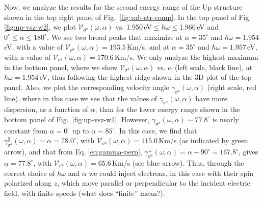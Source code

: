 \documentclass[floatfix,prb,aps,superscriptaddress,showpacs,11pt,preprint,letterpaper]{revtex4}
\begin{document}
Now, we analyze the results for the second energy range of the Up structure
shown in the top right panel of Fig.~\ref{fig:vab-str-comp}. In the top panel
of Fig. \ref{fig:up-vsz-w2}, we plot $\mathcal{V}_{\sigma^{\mathrm{z}}}
(\omega,\alpha)$ vs. 1.950\,eV$\leq\hbar\omega\leq$1.960\,eV and
$0^\circ\leq\alpha\leq 180^\circ$. We see two broad peaks that maximize at
$\alpha=35^{\circ}$ and $\hbar\omega= 1.954$\,eV, with a value of
$\mathcal{V}_{\sigma^{\mathrm{z}}}(\omega,\alpha) = 193.5$\,Km/s, and at
$\alpha=35^{\circ}$ and $\hbar\omega= 1.957$\,eV, with a value of
$\mathcal{V}_{\sigma^{\mathrm{z}}}(\omega,\alpha) = 170.6$\,Km/s. We only
analyze the highest  maximum in the bottom panel, where we  show
$\mathcal{V}_{\sigma^{\mathrm{z}}} (\omega,\alpha)$ vs. $\alpha$ (left scale,
black line), at $\hbar\omega= 1.954$\,eV, thus following the highest ridge
shown in the 3D plot of the top panel. Also, we plot the corresponding velocity
angle $\gamma_{\sigma^\mathrm{z}}(\omega,\alpha)$ (right scale, red line),
where in this case we see that the values of $\gamma_{\sigma^z}(\omega,\alpha)$
have more dispersion, as a function of $\alpha$, than for the lower energy
range shown in the bottom panel of Fig.~\ref{fig:up-vsz-w1}. However,
$\gamma_{\sigma^z}(\omega,\alpha)\sim 77.8^\circ$ is nearly constant from
$\alpha=0^\circ$ up to $\alpha\sim 85^\circ$. In this case, we find that
$\gamma^\parallel_{\sigma^\mathrm{z}}(\omega,\alpha)=\alpha=78.0^\circ$, with
$\mathcal{V}_{\sigma^{\mathrm{z}}}(\omega,\alpha) = 115.0$\,Km/s (as indicated
by green arrow), and that from Eq. \eqref{eq:gamma-perp},
$\gamma^\perp_{\sigma^\mathrm{z}}(\omega,\alpha)=\alpha-90^\circ=167.8^\circ$,
gives $\alpha=77.8^\circ$, with
$\mathcal{V}_{\sigma^{\mathrm{z}}}(\omega,\alpha) = 65.6$\,Km/s (see blue
arrow). Thus, through the correct choice of $\hbar\omega$ and $\alpha$ we could
inject electrons, in this case with their spin polarized along $z$, which move
parallel or perpendicular to the incident electric field, with finite speeds
{\color{red}(what does “finite” mean?)}.
\end{document}
